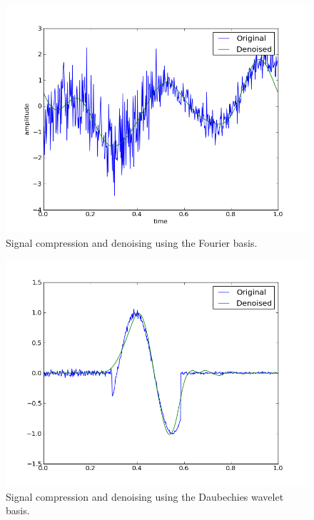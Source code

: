 \documentclass[10pt,conference,compsocconf]{IEEEtran}
\begin{document}
\begin{figure}[tbp]
  \centering
  \includegraphics[width=\columnwidth]{img/denoised_signal_1d}
  \caption{Signal compression and denoising using the Fourier basis.}
  \vspace{-3mm}
  \label{fig:denoise-fourier}
\end{figure}
\begin{figure}[htbp]
  \centering
  \includegraphics[width=\columnwidth]{img/local_wdenoised_1d}
  \vspace{-3mm}
  \caption{Signal compression and denoising using the Daubechies wavelet basis.}
  \label{fig:denoise-wavelet}
\end{figure}
\end{document}
